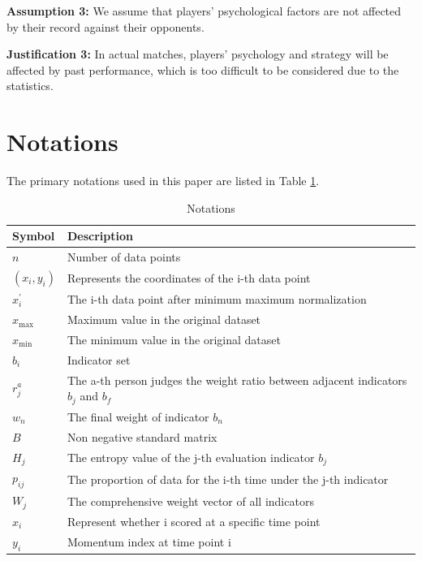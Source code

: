\documentclass[12pt]{article}  %
\begin{document}
    \textbf{Assumption 3:} We assume that players' psychological factors are not affected by their record against their opponents.

    \textbf{Justification 3:} In actual matches, players' psychology and strategy will be affected by past performance, which is too difficult to be considered due to the statistics.

    
    \newpage

\section{Notations}
The primary notations used in this paper are listed in Table \ref{tab:notation}.

\begin{table}[htbp]
    \centering
    \caption{Notations}
    \label{tab:notation}
    \begin{tabular}{m{4cm}<{\centering}m{10cm}<{\centering}}
    \toprule[2pt]
    Symbol & Description \\
    \midrule[1pt]
    $n$ & Number of data points \\[0.5ex]
    $(x_{i},y_{i})$ & Represents the coordinates of the i-th data point \\[0.5ex]
    $x_{i}^{'}$ & The i-th data point after minimum maximum normalization \\[0.5ex]
    $x_{\max}$ & Maximum value in the original dataset \\[0.5ex]
    $x_{\min}$ & The minimum value in the original dataset \\[0.5ex]
    $b_{i}$ & Indicator set \\[0.5ex]
    $r_{j}^{a}$ & The a-th person judges the weight ratio between adjacent indicators $b_{j}$ and $b_{f}$ \\[0.5ex]
    $w_{n}$ & The final weight of indicator $b_{n}$ \\[0.5ex]
    $B$ & Non negative standard matrix \\[0.5ex]
    $H_{j}$ & The entropy value of the j-th evaluation indicator $b_{j}$ \\[0.5ex]
    $p_{ij}$ & The proportion of data for the i-th time under the j-th indicator \\[0.5ex]
    $W_{j}$ & The comprehensive weight vector of all indicators \\[0.5ex]
    $x_{i}$ & Represent whether i scored at a specific time point \\[0.5ex]
    $y_{i}$ & Momentum index at time point i \\[0.5ex]

\end{tabular}
\end{table}
\end{document}

